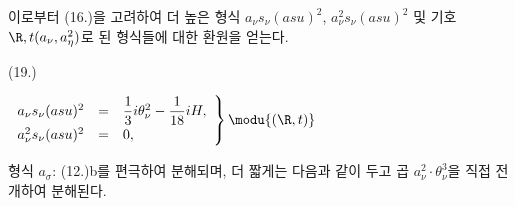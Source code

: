 
이로부터 (16.)을 고려하여 더 높은 형식 $a_\nu s_\nu(asu)^2$, $a_\nu^2s_\nu(asu)^2$ 및 기호 $\R,t(a_\nu,a_\eta^2)$로 된 형식들에 대한 환원을 얻는다.
\par\smallskip\noindent
\begin{minipage}[c]{4.8em}
\centering (19.)
\end{minipage}%
\begin{minipage}[c]{\dimexpr\linewidth-4.8em\relax}
\centering
\(\displaystyle
\left.\begin{array}{rcl}
a_\nu s_\nu(asu)^2&=&\dfrac13 i\theta_\nu^2-\dfrac1{18}iH,\\[0.5em]
a_\nu^2s_\nu(asu)^2&=&0,
\end{array}\right\}\modu{(\R,t)}
\)
\end{minipage}
\par\smallskip
형식 $a_\sigma$: (12.)b를 편극하여 분해되며, 더 짧게는 다음과 같이 두고 곱 $a_\nu^2\cdot\theta_\nu^3$을 직접 전개하여 분해된다.
